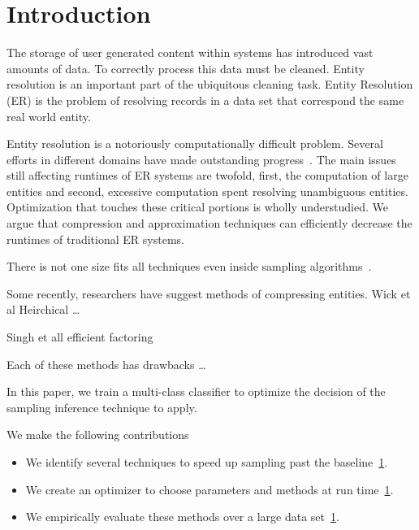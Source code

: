 
\section{Introduction}

The storage of user generated content within systems has introduced 
vast amounts of data.
To correctly process this data must be cleaned. 
Entity resolution is an important part of the ubiquitous cleaning task.
Entity Resolution (ER) is the problem of resolving records in
a data set that correspond the same real world entity.

Entity resolution is a notoriously computationally difficult problem.
Several efforts in different domains have made outstanding progress~\cite{}.
The main issues still affecting runtimes of ER systems are
twofold, first, the computation of large entities and second, excessive
computation spent resolving unambiguous entities.
Optimization that touches these critical portions is wholly understudied.
We argue that compression and approximation 
techniques can efficiently decrease the runtimes of traditional ER systems.

There is not one size fits all techniques even inside sampling algorithms~\cite{sculley2006compression}.

Some recently, researchers have suggest methods of compressing entities.
Wick et al Heirchical \ldots

Singh et all efficient factoring %

Each of these methods has drawbacks \ldots

In this paper, we train a multi-class classifier to optimize the decision of
the sampling inference technique to apply.


We make the following contributions

\begin{itemize}
\item We identify several techniques to speed up sampling past the baseline~\ref{}.
\item We create an optimizer to choose parameters and methods at run time~\ref{}.
\item We empirically evaluate these methods over a large data set~\ref{}.
\end{itemize}




